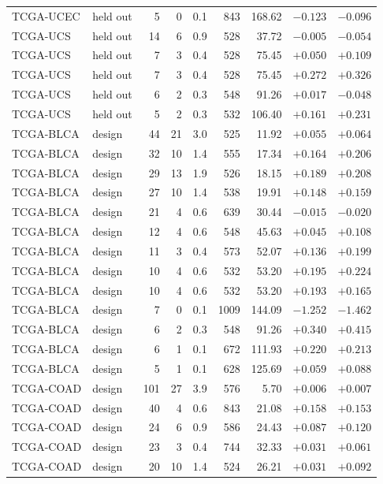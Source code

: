 \begin{longtable}{@{}llrrrrrrr@{}}
TCGA-UCEC & held out & 5 & 0 & 0.1 & 843 & 168.62 & $-0.123$ & $-0.096$\\
TCGA-UCS & held out & 14 & 6 & 0.9 & 528 & 37.72 & $-0.005$ & $-0.054$\\
TCGA-UCS & held out & 7 & 3 & 0.4 & 528 & 75.45 & $+0.050$ & $+0.109$\\
TCGA-UCS & held out & 7 & 3 & 0.4 & 528 & 75.45 & $+0.272$ & $+0.326$\\
TCGA-UCS & held out & 6 & 2 & 0.3 & 548 & 91.26 & $+0.017$ & $-0.048$\\
TCGA-UCS & held out & 5 & 2 & 0.3 & 532 & 106.40 & $+0.161$ & $+0.231$\\
TCGA-BLCA & design & 44 & 21 & 3.0 & 525 & 11.92 & $+0.055$ & $+0.064$\\
TCGA-BLCA & design & 32 & 10 & 1.4 & 555 & 17.34 & $+0.164$ & $+0.206$\\
TCGA-BLCA & design & 29 & 13 & 1.9 & 526 & 18.15 & $+0.189$ & $+0.208$\\
TCGA-BLCA & design & 27 & 10 & 1.4 & 538 & 19.91 & $+0.148$ & $+0.159$\\
TCGA-BLCA & design & 21 & 4 & 0.6 & 639 & 30.44 & $-0.015$ & $-0.020$\\
TCGA-BLCA & design & 12 & 4 & 0.6 & 548 & 45.63 & $+0.045$ & $+0.108$\\
TCGA-BLCA & design & 11 & 3 & 0.4 & 573 & 52.07 & $+0.136$ & $+0.199$\\
TCGA-BLCA & design & 10 & 4 & 0.6 & 532 & 53.20 & $+0.195$ & $+0.224$\\
TCGA-BLCA & design & 10 & 4 & 0.6 & 532 & 53.20 & $+0.193$ & $+0.165$\\
TCGA-BLCA & design & 7 & 0 & 0.1 & 1009 & 144.09 & $-1.252$ & $-1.462$\\
TCGA-BLCA & design & 6 & 2 & 0.3 & 548 & 91.26 & $+0.340$ & $+0.415$\\
TCGA-BLCA & design & 6 & 1 & 0.1 & 672 & 111.93 & $+0.220$ & $+0.213$\\
TCGA-BLCA & design & 5 & 1 & 0.1 & 628 & 125.69 & $+0.059$ & $+0.088$\\
TCGA-COAD & design & 101 & 27 & 3.9 & 576 & 5.70 & $+0.006$ & $+0.007$\\
TCGA-COAD & design & 40 & 4 & 0.6 & 843 & 21.08 & $+0.158$ & $+0.153$\\
TCGA-COAD & design & 24 & 6 & 0.9 & 586 & 24.43 & $+0.087$ & $+0.120$\\
TCGA-COAD & design & 23 & 3 & 0.4 & 744 & 32.33 & $+0.031$ & $+0.061$\\
TCGA-COAD & design & 20 & 10 & 1.4 & 524 & 26.21 & $+0.031$ & $+0.092$\\

\end{longtable}
